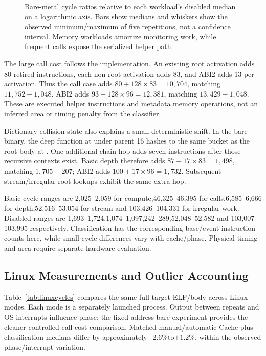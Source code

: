 \begin{figure}[t]
\centering
\caption{Bare-metal cycle ratios relative to each workload's disabled median on a logarithmic axis. Bars show medians and whiskers show the observed minimum/maximum of five repetitions, not a confidence interval. Memory workloads amortize monitoring work, while frequent calls expose the serialized helper path.}
\label{fig:overhead}
\end{figure}

The large call cost follows the implementation. An existing root activation adds 80 retired instructions, each non-root activation adds 83, and ABI2 adds 13 per activation. Thus the call case adds $80+128\times 83=10,704$, matching $11,752-1,048$. ABI2 adds $93+128\times 96=12,381$, matching $13,429-1,048$. These are executed helper instructions and metadata memory operations, not an inferred area or timing penalty from the classifier.

Dictionary collision state also explains a small deterministic shift. In the bare binary, the deep function at  under parent 16 hashes to the same bucket as the root body at . One additional chain hop adds seven instructions after those recursive contexts exist. Basic depth therefore adds $87+17\times 83=1,498$, matching $1,705-207$; ABI2 adds $100+17\times 96=1,732$. Subsequent stream/irregular root lookups exhibit the same extra hop.

Basic cycle ranges are 2,025--2,059 for compute,46,325--46,395 for calls,6,585--6,666 for depth,52,516--53,054 for stream and 103,426--104,331 for irregular work. Disabled ranges are 1,693--1,724,1,074--1,097,242--289,52,048--52,582 and 103,007--103,995 respectively. Classification has the corresponding base/event instruction counts here, while small cycle differences vary with cache/phase. Physical timing and area require separate hardware evaluation.

\subsection{Linux Measurements and Outlier Accounting}

Table~\ref{tab:linuxcycles} compares the same full target ELF/body across Linux modes. Each mode is a separately launched process. Output between repeats and OS interrupts influence phase; the fixed-address bare experiment provides the cleaner controlled call-cost comparison. Matched manual/automatic Cache-plus-classification medians differ by approximately$-2.6\%$to$+1.2\%$, within the observed phase/interrupt variation.

